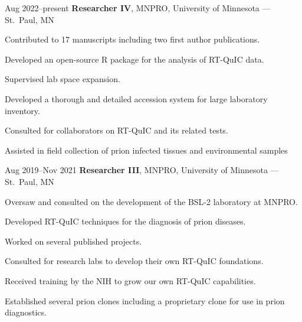 \documentclass{resume}
\begin{document}
        \begin{twocolentry}{Aug 2022--present}
            \textbf{Researcher IV}, MNPRO, University of Minnesota --- St.\ Paul, MN
        \end{twocolentry}
        \vspace{0.10 cm}
        \begin{onecolentry}
            \begin{highlights}
                \item Contributed to 17 manuscripts including two first author publications.
                \item Developed an open-source R package for the analysis of RT-QuIC data.
                \item Supervised lab space expansion.
                \item Developed a thorough and detailed accession system for large laboratory inventory.
                \item Consulted for collaborators on RT-QuIC and its related tests.
                \item Assisted in field collection of prion infected tissues and environmental samples
            \end{highlights}
        \end{onecolentry}
        \vspace{0.2cm}

        \begin{twocolentry}{Aug 2019--Nov 2021}
            \textbf{Researcher III}, MNPRO, University of Minnesota --- St.\ Paul, MN
        \end{twocolentry}
        \vspace{0.10cm}
        \begin{onecolentry}
            \begin{highlights}
                \item Oversaw and consulted on the development of the BSL-2 laboratory at MNPRO.\
                \item Developed RT-QuIC techniques for the diagnosis of prion diseases.
                \item Worked on several published projects.
                \item Consulted for research labs to develop their own RT-QuIC foundations.
                \item Received training by the NIH to grow our own RT-QuIC capabilities.
                \item Established several prion clones including a proprietary clone for use in prion diagnostics.
            \end{highlights}
        \end{onecolentry}
        \vspace{0.2cm}
\end{document}
